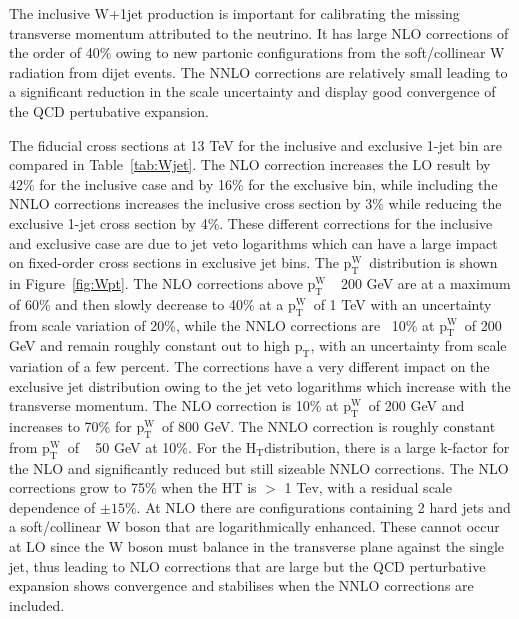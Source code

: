 \documentclass[a4paper,11pt,notoc]{article}
\newcommand{\pt}{\ensuremath{\mathrm{p_T}}}
\newcommand{\ptW}{\ensuremath{\mathrm{p_T^{W}}}}
\newcommand{\Ht}{\ensuremath{\mathrm{H_T}}}
\begin{document}
The inclusive W+1jet production is important for calibrating the missing transverse momentum attributed to the neutrino. It has large NLO corrections of the order of 40\% owing to new partonic configurations from the soft/collinear W radiation from dijet events. The NNLO corrections are relatively small leading to a significant reduction in the scale uncertainty and display good convergence of the QCD pertubative expansion. %

The fiducial cross sections at 13 TeV for the inclusive and exclusive 1-jet bin are compared in Table~\ref{tab:Wjet}. The NLO correction increases the LO result by 42\% for the inclusive case and by 16\% for the exclusive bin, while including the NNLO corrections increases the inclusive cross section by 3\% while reducing the exclusive 1-jet cross section by 4\%. These different corrections for the inclusive and exclusive case are due to jet veto logarithms which can have a large impact on fixed-order cross sections in exclusive jet bins. The \ptW\ distribution is shown in Figure~\ref{fig:Wpt}. The NLO corrections above \ptW\ $~$ 200 GeV are at a maximum of 60\% and then slowly decrease to 40\% at a \ptW\ of 1 TeV with an uncertainty from scale variation of 20\%, while the NNLO corrections are ~10\% at \ptW\ of 200 GeV and remain roughly constant out to high \pt, with an uncertainty from scale variation of a few percent. The corrections have a very different impact on the exclusive jet distribution owing to the jet veto logarithms which increase with the transverse momentum. The NLO correction is 10\% at \ptW\ of 200 GeV and increases to 70\% for \ptW\ of 800 GeV. The NNLO correction is roughly constant from \ptW\ of ~ 50 GeV at 10\%. For the \Ht distribution, there is a large k-factor for the NLO and significantly reduced but still sizeable NNLO corrections. The NLO corrections grow to 75\% when the HT is $>$ 1 Tev, with a residual scale dependence of $\pm 15\%$. %
At NLO there are configurations containing 2 hard jets and a soft/collinear W boson that are logarithmically enhanced. These cannot occur at LO since the W boson must balance in the transverse plane against the single jet, thus leading to NLO corrections that are large but the QCD perturbative expansion shows convergence and stabilises when the NNLO corrections are included. 
\end{document}
